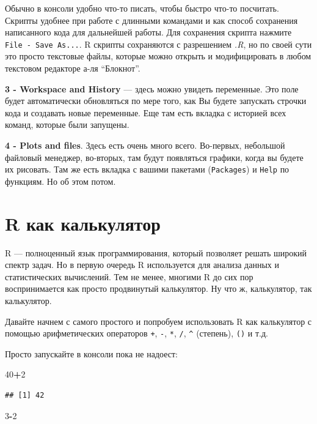 \documentclass[]{book}
\newenvironment{Shaded}{\begin{snugshade}}{\end{snugshade}}
\newcommand{\DecValTok}[1]{\textcolor[rgb]{0.00,0.00,0.81}{#1}}
\newcommand{\OperatorTok}[1]{\textcolor[rgb]{0.81,0.36,0.00}{\textbf{#1}}}
\begin{document}
Обычно в консоли удобно что-то писать, чтобы быстро что-то посчитать.
Скрипты удобнее при работе с длинными командами и как способ сохранения
написанного кода для дальнейшей работы. Для сохранения скрипта нажмите
\texttt{File\ -\ Save\ As...}. R скрипты сохраняются с разрешением
\emph{.R}, но по своей сути это просто текстовые файлы, которые можно
открыть и модифицировать в любом текстовом редакторе а-ля ``Блокнот''.

\textbf{3 - Workspace and History} --- здесь можно увидеть переменные.
Это поле будет автоматически обновляться по мере того, как Вы будете
запускать строчки кода и создавать новые переменные. Еще там есть
вкладка с историей всех команд, которые были запущены.

\textbf{4 - Plots and files}. Здесь есть очень много всего. Во-первых,
небольшой файловый менеджер, во-вторых, там будут появляться графики,
когда вы будете их рисовать. Там же есть вкладка с вашими пакетами
(\texttt{Packages}) и \texttt{Help} по функциям. Но об этом потом.

\section{R как калькулятор}\label{calc}

R --- полноценный язык программирования, который позволяет решать
широкий спектр задач. Но в первую очередь R используется для анализа
данных и статистических вычислений. Тем не менее, многими R до сих пор
воспринимается как просто продвинутый калькулятор. Ну что ж,
калькулятор, так калькулятор.

Давайте начнем с самого простого и попробуем использовать R как
калькулятор с помощью арифметических операторов \texttt{+}, \texttt{-},
\texttt{*}, \texttt{/}, \texttt{\^{}} (степень), \texttt{()} и т.д.

Просто запускайте в консоли пока не надоест:

\begin{Shaded}
\begin{Highlighting}[]
\DecValTok{40}\OperatorTok{+}\DecValTok{2}
\end{Highlighting}
\end{Shaded}

\begin{verbatim}
## [1] 42
\end{verbatim}

\begin{Shaded}
\begin{Highlighting}[]
\DecValTok{3}\OperatorTok{-}\DecValTok{2}
\end{Highlighting}
\end{Shaded}
\end{document}
